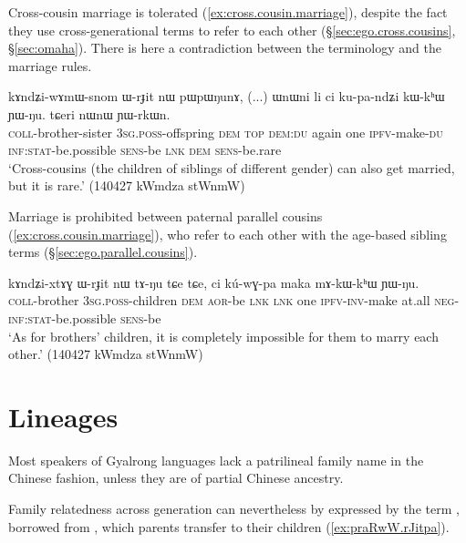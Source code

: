 Cross-cousin marriage is tolerated (\ref{ex:cross.cousin.marriage}), despite the fact they use cross-gen\-er\-ation\-al terms to refer to each other (§\ref{sec:ego.cross.cousins}, §\ref{sec:omaha}). There is here a contradiction between the terminology and the marriage rules.

\begin{exe}
\ex \label{ex:cross.cousin.marriage}
\gll kɤndʑi-wɤmɯ-snom ɯ-rɟit nɯ pɯpɯŋunɤ, (...) ɯnɯni li ci ku-pa-ndʑi kɯ-kʰɯ ɲɯ-ŋu. tɕeri nɯnɯ ɲɯ-rkɯn. \\
\textsc{coll}-brother-sister \textsc{3sg}.\textsc{poss}-offspring \textsc{dem} \textsc{top} { } \textsc{dem}:\textsc{du} again one \textsc{ipfv}-make-\textsc{du} \textsc{inf}:\textsc{stat}-be.possible \textsc{sens}-be \textsc{lnk} \textsc{dem} \textsc{sens}-be.rare \\ 
\glt `Cross-cousins (the children of siblings of different gender) can also get married, but it is rare.' (140427 kWmdza stWnmW)
\end{exe}

Marriage is prohibited between paternal parallel cousins (\ref{ex:cross.cousin.marriage}), who refer to each other with the age-based sibling terms (§\ref{sec:ego.parallel.cousins}).

\begin{exe}
\ex \label{ex:FBCh.marriage}
\gll kɤndʑi-xtɤɣ ɯ-rɟit nɯ tɤ-ŋu tɕe tɕe, ci kú-wɣ-pa maka mɤ-kɯ-kʰɯ ɲɯ-ŋu. \\
\textsc{coll}-brother \textsc{3sg}.\textsc{poss}-children \textsc{dem} \textsc{aor}-be \textsc{lnk} \textsc{lnk} one \textsc{ipfv}-\textsc{inv}-make at.all \textsc{neg}-\textsc{inf}:\textsc{stat}-be.possible \textsc{sens}-be \\
\glt `As for brothers' children, it is completely impossible for them to marry each other.' (140427 kWmdza stWnmW)
\end{exe}

\section{Lineages} \label{sec:lineage.kinship}
Most speakers of Gyalrong languages lack a patrilineal family name in the Chinese fashion, unless they are of partial Chinese ancestry. 

Family relatedness across generation can nevertheless by expressed by the term , borrowed from , which parents transfer to their children (\ref{ex:praRwW.rJitpa}).

